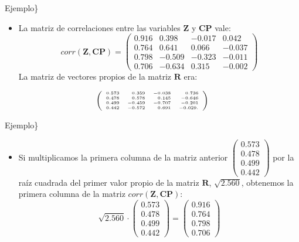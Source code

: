 \documentclass[
  spanish,
  ignorenonframetext,
]{beamer}
\providecommand{\tightlist}{%
  \setlength{\itemsep}{0pt}\setlength{\parskip}{0pt}}
\begin{document}
\begin{frame}{Ejemplo\}}
\protect\hypertarget{ejemplo-19}{}
\begin{itemize}
\tightlist
\item
  La matriz de correlaciones entre las variables \(\mathbf{Z}\) y
  \(\mathbf{CP}\) vale: \[
  corr(\mathbf{Z},\mathbf{CP}) =
  \left(
  \begin{array}{rrrr}
  0.916 & 0.398 & -0.017 & 0.042 \\
   0.764 & 0.641 & 0.066 & -0.037 \\
   0.798 & -0.509 & -0.323 & -0.011 \\
   0.706 & -0.634 & 0.315 & -0.002 
  \end{array}
  \right)
  \] La matriz de vectores propios de la matriz \(\mathbf{R}\) era:
\end{itemize}

\[
{\tiny
\left(
\begin{array}{rrrr}
0.573 & 0.359 & -0.038 & 0.736 \\
 0.478 & 0.578 & 0.145 & -0.646 \\
 0.499 & -0.459 & -0.707 & -0.201 \\
 0.442 & -0.572 & 0.691 & -0.029.
\end{array}
\right)
}\]
\end{frame}

\begin{frame}{Ejemplo\}}
\protect\hypertarget{ejemplo-20}{}
\begin{itemize}
\tightlist
\item
  Si multiplicamos la primera columna de la matriz anterior
  \(\begin{pmatrix}0.573 \\ 0.478\\ 0.499 \\ 0.442\end{pmatrix}\) por la
  raíz cuadrada del primer valor propio de la matriz \(\mathbf{R}\),
  \(\sqrt{2.560}\), obtenemos la primera columna de la matriz
  \(corr(\mathbf{Z},\mathbf{CP})\): \[
  \sqrt{2.560}\cdot \begin{pmatrix}0.573 \\ 0.478\\ 0.499 \\ 0.442\end{pmatrix} =
  \begin{pmatrix}0.916 \\ 0.764\\ 0.798 \\ 0.706\end{pmatrix}
  \]
\end{itemize}
\end{frame}
\end{document}
